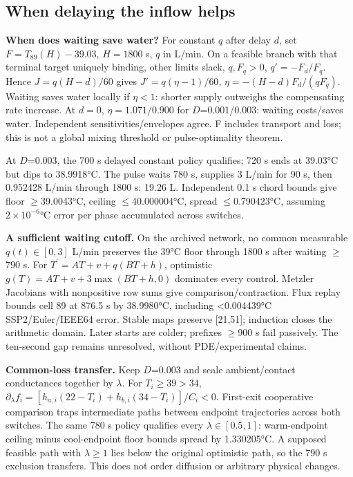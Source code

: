 \documentclass[12pt,a4paper]{article}
\begin{document}
\subsection{When delaying the inflow helps}
\textbf{When does waiting save water?} For constant $q$ after delay $d$, set $F=T_{89}(H)-39.03$, $H=1800$ s, $q$ in L/min. On a feasible branch with that terminal target uniquely binding, other limits slack, $q,F_q>0$, $q'=-F_d/F_q$. Hence $J=q(H-d)/60$ gives $J'=q(\eta-1)/60$, $\eta=-(H-d)F_d/(qF_q)$. Waiting saves water locally if $\eta<1$: shorter supply outweighs the compensating rate increase. At $d=0$, $\eta=1.071/0.900$ for $D$=0.001/0.003: waiting costs/saves water. Independent sensitivities/envelopes agree. F includes transport and loss; this is not a global mixing threshold or pulse-optimality theorem.

At $D$=0.003, the 700 s delayed constant policy qualifies; 720 s ends at 39.03°C but dips to 38.9918°C. The pulse waits 780 s, supplies 3 L/min for 90 s, then 0.952428 L/min through 1800 s: 19.26 L. Independent 0.1 s chord bounds give floor $\geq$39.0043°C, ceiling $\leq$40.000004°C, spread $\leq$0.790423°C, assuming $2\times10^{-6}$°C error per phase accumulated across switches.

\textbf{A sufficient waiting cutoff.} On the archived network, no common measurable $q(t)\in[0,3]$ L/min preserves the 39°C floor through 1800 s after waiting $\geq$790 s. For $T^{\prime}=AT+v+q(BT+h)$, optimistic $g(T)=AT+v+3\max(BT+h,0)$ dominates every control. Metzler Jacobians with nonpositive row sums give comparison/contraction. Flux replay bounds cell 89 at 876.5 s by 38.9980°C, including <0.004439°C SSP2/Euler/IEEE64 error. Stable maps preserve [21,51]; induction closes the arithmetic domain. Later starts are colder; prefixes $\geq$900 s fail passively. The ten-second gap remains unresolved, without PDE/experimental claims.

\textbf{Common-loss transfer.} Keep $D$=0.003 and scale ambient/contact conductances together by $\lambda$. For $T_i\ge39>34$, $\partial_\lambda f_i=[h_{a,i}(22-T_i)+h_{b,i}(34-T_i)]/C_i<0$. First-exit cooperative comparison traps intermediate paths between endpoint trajectories across both switches. The same 780 s policy qualifies every $\lambda\in[0.5,1]$: warm-endpoint ceiling minus cool-endpoint floor bounds spread by 1.330205°C. A supposed feasible path with $\lambda\ge1$ lies below the original optimistic path, so the 790 s exclusion transfers. This does not order diffusion or arbitrary physical changes.
\end{document}
